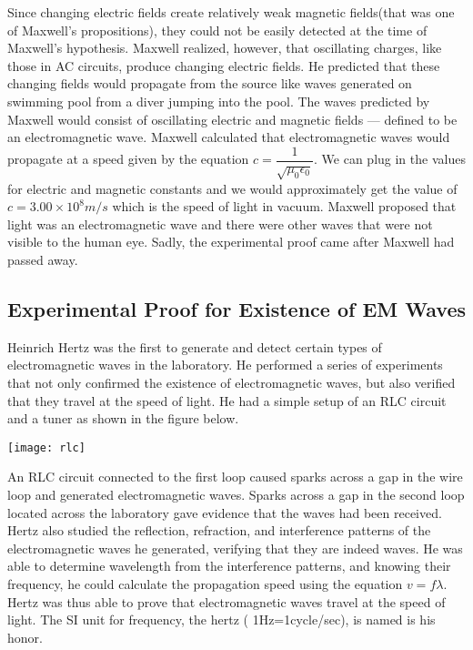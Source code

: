 \documentclass[11pt]{article}
\begin{document}
	Since changing electric fields create relatively weak magnetic fields(that was one of Maxwell's propositions), they could not be easily detected at the time of Maxwell’s hypothesis. Maxwell realized, however, that oscillating charges, like those in AC circuits, produce changing electric fields. He predicted that these changing fields would propagate from the source like waves generated on swimming pool from a diver jumping into the pool. The waves predicted by Maxwell would consist of oscillating electric and magnetic fields — defined to be an electromagnetic wave. Maxwell calculated that electromagnetic waves would propagate at a speed given by the equation $c = \dfrac{1}{\sqrt{\mu_{0}\epsilon_{0}}}$. We can plug in the values for electric and magnetic constants and we would approximately get the value of $c=3.00\times10^8m/s$ which is the speed of light in vacuum. Maxwell proposed that light was an electromagnetic wave and there were other waves that were not visible to the human eye. Sadly, the experimental proof came after Maxwell had passed away.
	\subsection*{Experimental Proof for Existence of EM Waves}
	Heinrich Hertz was the first to generate and detect certain types of electromagnetic waves in the laboratory. He performed a series of experiments that not only confirmed the existence of electromagnetic waves, but also verified that they travel at the speed of light. He had a simple setup of an RLC circuit and a tuner as shown in the figure below.
	\begin{center}
		\texttt{[image: rlc]}
	\end{center}
	An RLC circuit connected to the first loop caused sparks across a gap in the wire loop and generated electromagnetic waves. Sparks across a gap in the second loop located across the laboratory gave evidence that the waves had been received. Hertz also studied the reflection, refraction, and interference patterns of the electromagnetic waves he generated, verifying that they are indeed waves. He was able to determine wavelength from the interference patterns, and knowing their frequency, he could calculate the propagation speed using the equation $v=f\lambda$. Hertz was thus able to prove that electromagnetic waves travel at the speed of light. The SI unit for frequency, the hertz ( 1Hz=1cycle/sec), is named is his honor.
\end{document}
